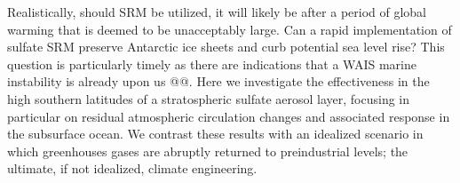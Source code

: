 \documentclass[grl]{AGUTeX}  %
\begin{document}
\begin{article}

Realistically, should SRM be utilized, it will likely be after a period of global warming that is deemed to be unacceptably large. Can a rapid implementation of sulfate SRM preserve Antarctic ice sheets and curb potential sea level rise? This question is particularly timely as there are indications that a WAIS marine instability is already upon us \citep{favier14,rignot14}@@. Here we investigate the effectiveness in the high southern latitudes of a stratospheric sulfate aerosol layer, focusing in particular on residual atmospheric circulation changes and associated response in the subsurface ocean. We contrast these results with an idealized scenario in which greenhouses gases are abruptly returned to preindustrial levels; the ultimate, if not idealized, climate engineering. 


\end{article}
\end{document}
